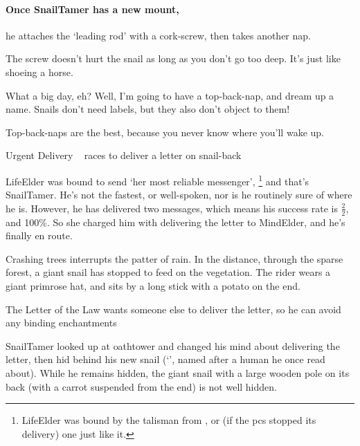 \paragraph{Once \gls{SnailTamer} has a new mount,}
he attaches the `leading rod' with a cork-screw, then takes another nap.

\begin{speechtext}
  The screw doesn't hurt the snail as long as you don't go too deep.
  It's just like shoeing a horse.

  What a big day, eh?
  Well, I'm going to have a top-back-nap, and dream up a name.
  Snails don't need labels, but they also don't object to them!

  Top-back-naps are the best, because you never know where you'll wake up.
\end{speechtext}

{Urgent Delivery}%
{~ races to deliver a letter on snail-back}%

\Gls{LifeElder} was bound to send `her most reliable messenger',%
\footnote{\Gls{LifeElder} was bound by the \gls{talisman} from , or (if the \glspl{pc} stopped its delivery) one just like it.}
and that's \gls{SnailTamer}.
He's not the fastest, or well-spoken, nor is he routinely sure of where he is.
However, he has delivered two messages, which means his success rate is $\frac{2}{2}$, and 100\%.
So she charged him with delivering the letter to \gls{MindElder}, and he's finally en route.

\begin{boxtext}
  Crashing trees interrupts the patter of rain.
  In the distance, through the sparse forest, a giant snail has stopped to feed on the vegetation.
  The rider wears a giant primrose hat, and sits by a long stick with a potato on the end.
\end{boxtext}

{The Letter of the Law}%
{ wants someone else to deliver the letter, so he can avoid any binding enchantments}%

\Gls{SnailTamer} looked up at \gls{oathtower} and changed his mind about delivering the letter, then hid behind his new snail (`\composeHumanName', named after a human he once read about).
While he remains hidden, the giant snail with a large wooden pole on its back (with a carrot suspended from the end) is not well hidden.

